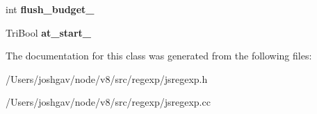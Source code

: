 \begin{DoxyCompactItemize}
\item 
int {\bfseries flush\+\_\+budget\+\_\+}\hypertarget{classv8_1_1internal_1_1_trace_a648788bc8551e4a6dcd9e94a5723b029}{}\label{classv8_1_1internal_1_1_trace_a648788bc8551e4a6dcd9e94a5723b029}

\item 
Tri\+Bool {\bfseries at\+\_\+start\+\_\+}\hypertarget{classv8_1_1internal_1_1_trace_a6ed2b4849f5df1a3dd9b40bc8e9e08d0}{}\label{classv8_1_1internal_1_1_trace_a6ed2b4849f5df1a3dd9b40bc8e9e08d0}

\end{DoxyCompactItemize}


The documentation for this class was generated from the following files\+:\begin{DoxyCompactItemize}
\item 
/\+Users/joshgav/node/v8/src/regexp/jsregexp.\+h\item 
/\+Users/joshgav/node/v8/src/regexp/jsregexp.\+cc\end{DoxyCompactItemize}
